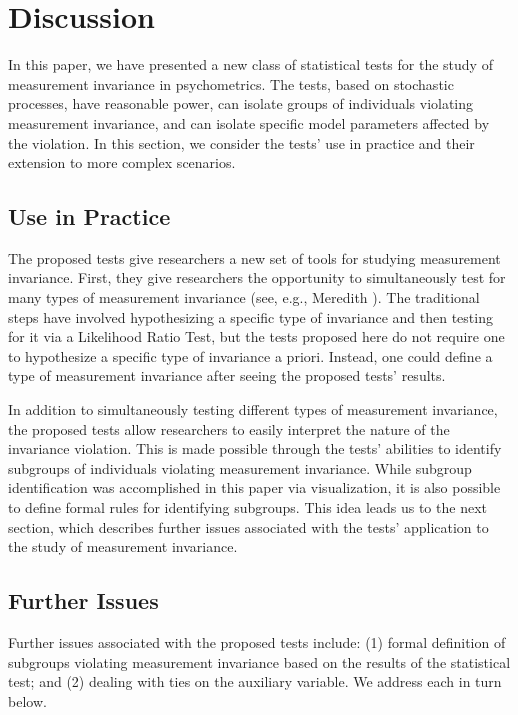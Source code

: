 \documentclass[man]{apa}
\begin{document}
\section{Discussion}
In this paper, we have presented a new class of statistical tests for
the study of measurement invariance in psychometrics.  The tests,
based on stochastic processes, have reasonable power, can isolate
groups of individuals violating measurement invariance, and can
isolate specific model parameters affected by the violation.  In this
section, we consider the tests' use in practice and their 
extension to more complex scenarios.

\subsection{Use in Practice}
The proposed tests give researchers a new set of tools for studying 
measurement invariance.  First, they give researchers the
opportunity to simultaneously test for many types of measurement
invariance (see, e.g., Meredith ).  The traditional
steps have involved hypothesizing a specific type of invariance and
then testing for it via a Likelihood Ratio Test, but the tests
proposed here do not require one to hypothesize a specific type of
invariance a priori.  Instead, one could define a type of measurement
invariance after seeing the proposed tests' results.

In addition to simultaneously testing different types of measurement
invariance, the proposed tests allow researchers to easily interpret
the nature of the invariance violation.  This is made possible through
the tests' abilities to identify subgroups of individuals violating
measurement invariance.  While subgroup identification was
accomplished in this paper via visualization, it is also possible to
define 
formal rules for identifying subgroups.  This idea leads us to the
next section, which describes further issues associated with the
tests' application to the study of measurement invariance.

\subsection{Further Issues}
Further issues associated with the proposed tests include: (1) formal
definition of subgroups violating measurement invariance based on the
results of the statistical test; and (2) dealing
with ties on the auxiliary variable.  We address each in turn below. 
\end{document}
